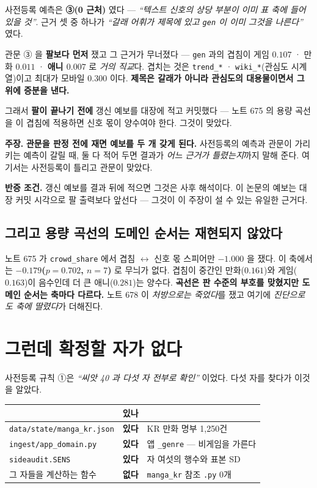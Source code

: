 \documentclass[10pt,a4paper]{article}
\newcommand{\claim}[2]{\begin{claimbox}\textbf{주장.} #1\par\smallskip
  \textcolor{gray!70}{\textbf{반증 조건.} #2}\end{claimbox}}
\begin{document}
사전등록 예측은 \textbf{③(0 근처)} 였다 --- \emph{``텍스트 신호의 상당 부분이 이미 표
축에 들어 있을 것''}. 근거 셋 중 하나가 \emph{``갈래 어휘가 제목에 있고 \texttt{gen}
이 이미 그것을 나른다''} 였다.

관문 ③ 을 \textbf{팔보다 먼저} 쟀고 그 근거가 무너졌다 --- \texttt{gen} 과의 겹침이
게임 $0.107$ · 만화 $0.011$ · \textbf{애니 $0.007$} 로 \emph{거의 직교}다. 겹치는 것은
\texttt{trend\_*} · \texttt{wiki\_*}(관심도 시계열)이고 최대가 모바일 $0.300$ 이다.
\textbf{제목은 갈래가 아니라 관심도의 대용물이면서 그 위에 증분을 낸다.}

그래서 \textbf{팔이 끝나기 전에} 갱신 예보를 대장에 적고 커밋했다 --- 노트 675 의 용량
곡선을 이 겹침에 적용하면 신호 몫이 양수여야 한다. 그것이 맞았다.

\claim{\textbf{관문을 판정 전에 재면 예보를 두 개 갖게 된다.} 사전등록의 예측과 관문이
가리키는 예측이 갈릴 때, 둘 다 적어 두면 결과가 \emph{어느 근거가 틀렸는지}까지
말해 준다. 여기서는 사전등록이 틀리고 관문이 맞았다.}
{갱신 예보를 결과 뒤에 적으면 그것은 사후 해석이다. 이 논문의 예보는 대장 커밋
시각으로 팔 출력보다 앞선다 --- 그것이 이 주장이 설 수 있는 유일한 근거다.}

\subsection*{그리고 용량 곡선의 도메인 순서는 재현되지 않았다}

노트 675 가 \verb|crowd_share| 에서 겹침 $\leftrightarrow$ 신호 몫 스피어만
$-1.000$ 을 쟀다. 이 축에서는 \textbf{$-0.179$($p{=}0.702$, $n{=}7$)} 로 무늬가 없다.
겹침이 중간인 만화($0.161$)와 게임($0.163$)이 음수인데 더 큰 애니($0.281$)는 양수다.
\textbf{곡선은 판 수준의 부호를 맞혔지만 도메인 순서는 축마다 다르다.} 노트 678 이
\emph{처방으로는 죽었다}를 쟀고 여기에 \emph{진단으로도 축에 딸렸다}가 더해진다.

\section{그런데 확정할 자가 없다}

사전등록 규칙 ①은 \emph{``씨앗 40 과 다섯 자 전부로 확인''} 이었다. 다섯 자를 찾다가
이것을 알았다.

\begin{center}
\begin{tabular}{lll}
\toprule
& 있나 & \\
\midrule
\verb|data/state/manga_kr.json| & \textbf{있다} & KR 만화 명부 1{,}250건 \\
\verb|ingest/app_domain.py| & \textbf{있다} & 앱 \verb|_genre| --- 비게임을 가른다 \\
\verb|sideaudit.SENS| & \textbf{있다} & 자 여섯의 행수와 표본 SD \\
\midrule
그 자들을 계산하는 함수 & \textbf{없다} & \verb|manga_kr| 참조 \verb|.py| 0개 \\
\bottomrule
\end{tabular}
\end{center}
\end{document}
